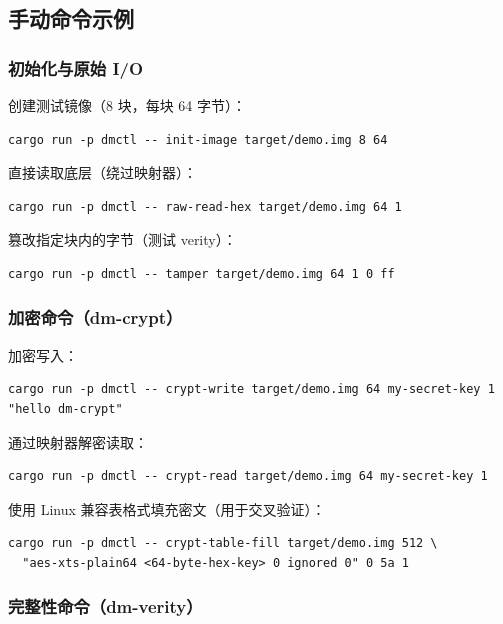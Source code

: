 \subsection{手动命令示例}

\subsubsection{初始化与原始 I/O}

创建测试镜像（8 块，每块 64 字节）：
\begin{lstlisting}[basicstyle=\ttfamily\small, breaklines=true]
cargo run -p dmctl -- init-image target/demo.img 8 64
\end{lstlisting}

直接读取底层（绕过映射器）：
\begin{lstlisting}[basicstyle=\ttfamily\small, breaklines=true]
cargo run -p dmctl -- raw-read-hex target/demo.img 64 1
\end{lstlisting}

篡改指定块内的字节（测试 verity）：
\begin{lstlisting}[basicstyle=\ttfamily\small, breaklines=true]
cargo run -p dmctl -- tamper target/demo.img 64 1 0 ff
\end{lstlisting}

\subsubsection{加密命令（dm-crypt）}

加密写入：
\begin{lstlisting}[basicstyle=\ttfamily\small, breaklines=true]
cargo run -p dmctl -- crypt-write target/demo.img 64 my-secret-key 1 "hello dm-crypt"
\end{lstlisting}

通过映射器解密读取：
\begin{lstlisting}[basicstyle=\ttfamily\small, breaklines=true]
cargo run -p dmctl -- crypt-read target/demo.img 64 my-secret-key 1
\end{lstlisting}

使用 Linux 兼容表格式填充密文（用于交叉验证）：
\begin{lstlisting}[basicstyle=\ttfamily\small, breaklines=true]
cargo run -p dmctl -- crypt-table-fill target/demo.img 512 \
  "aes-xts-plain64 <64-byte-hex-key> 0 ignored 0" 0 5a 1
\end{lstlisting}

\subsubsection{完整性命令（dm-verity）}

